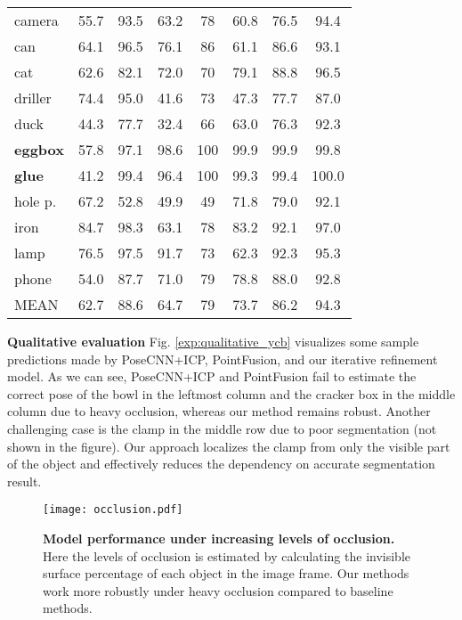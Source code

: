 \documentclass[10pt,twocolumn,letterpaper]{article}
\begin{document}
\begin{table*}
\begin{tabular}{l|c|c|c|c|c|c|c}
camera & 55.7 & 93.5 & 63.2 & 78 & 60.8 & 76.5 & 94.4 \\
can & 64.1 & 96.5 & 76.1 & 86 & 61.1 & 86.6 & 93.1 \\
cat & 62.6 & 82.1 & 72.0 & 70 & 79.1 & 88.8 & 96.5 \\
driller & 74.4 & 95.0 & 41.6 & 73 & 47.3 & 77.7 & 87.0 \\
duck & 44.3 & 77.7 & 32.4 & 66 & 63.0 & 76.3 & 92.3 \\
\textbf{eggbox} & 57.8 & 97.1 & 98.6 & 100 & 99.9 & 99.9 & 99.8 \\
\textbf{glue} & 41.2 & 99.4 & 96.4 & 100 & 99.3 & 99.4 & 100.0 \\
hole p. & 67.2 & 52.8 & 49.9 & 49 & 71.8 & 79.0 & 92.1 \\
iron & 84.7 & 98.3 & 63.1 & 78 & 83.2 & 92.1 & 97.0 \\
lamp & 76.5 & 97.5 & 91.7 & 73 & 62.3 & 92.3 & 95.3 \\
phone & 54.0 & 87.7 & 71.0 & 79 & 78.8 & 88.0 & 92.8 \\ \hline
MEAN & 62.7 & 88.6 & 64.7 & 79 & 73.7 & 86.2 & 94.3 \\ \hline
\end{tabular}
\label{exp:LineMOD}
\vspace{-10pt}
\end{table*}

\noindent\textbf{Qualitative evaluation} 
Fig. \ref{exp:qualitative_ycb} visualizes some sample predictions made by PoseCNN+ICP, PointFusion, and our iterative refinement model. As we can see, PoseCNN+ICP and PointFusion fail to estimate the correct pose of the bowl in the leftmost column and the cracker box in the middle column due to heavy occlusion, whereas our method remains robust. Another challenging case is the clamp in the middle row due to poor segmentation (not shown in the figure). Our approach localizes the clamp from only the visible part of the object and effectively reduces the dependency on accurate segmentation result.

\begin{figure}[t]
	\centering
	\texttt{[image: occlusion.pdf]}
	\caption{\textbf{Model performance under increasing levels of occlusion.} Here the levels of occlusion is estimated by calculating the invisible surface percentage of each object in the image frame. Our methods work more robustly under heavy occlusion compared to baseline methods.}
	\label{fig:exp_occlusion2}
\end{figure}
\end{document}
